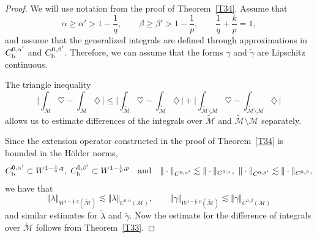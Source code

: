 \documentclass[intlimits,12pt,reqno]{amsart}
\newcommand{\cM}{\mathcal M}
\numberwithin{equation}{section}
\theoremstyle{definition}
\begin{document}
\begin{proof}
We will use notation from the proof of Theorem~\ref{T34}. Assume that
$$
\alpha\geq\alpha'>1-\frac{1}{q},
\qquad
\beta\geq\beta'>1-\frac{1}{p},
\qquad
\frac{1}{q}+\frac{k}{p}=1,
$$
and assume that the generalized integrals are defined through approximations in $C_{\rm b}^{0,\alpha'}$ and $C_{\rm b}^{0,\beta'}$. Therefore, we can assume that the forms $\gamma$ and $\tilde{\gamma}$ are Lipschitz continuous.

The triangle inequality
$$
\Bigg|\int_{\cM}\heartsuit-\int_{\cM}\diamondsuit\,\Bigg|\leq 
\Bigg|\int_{\widetilde{\cM}}\heartsuit-\int_{\widetilde{\cM}}\diamondsuit\,\Bigg|+
\Bigg|\int_{{\widetilde{\cM}}\setminus\cM}\heartsuit-\int_{{\widetilde{\cM}}\setminus\cM}\diamondsuit\,\Bigg|
$$
allows us to estimate differences of the integrals over $\widetilde{\cM}$ and $\widetilde{\cM}\setminus\cM$ separately.

Since the extension operator constructed in the proof of Theorem~\ref{T34} is bounded in the H\"older norms,
$$
C_{\rm b}^{0,\alpha'}\subset W^{1-\frac{1}{q},q},\ 
C_{\rm b}^{0,\beta'}\subset W^{1-\frac{1}{p},p}
\quad
\text{and}
\quad
\Vert\cdot\Vert_{C^{0,\alpha'}}\lesssim \Vert\cdot\Vert_{C^{0,\alpha}},\ 
\Vert\cdot\Vert_{C^{0,\beta'}}\lesssim \Vert\cdot\Vert_{C^{0,\beta}},
$$
we have that
$$
\Vert\lambda\Vert_{W^{1-\frac{1}{q},q}(\widetilde{\cM})}\lesssim 
\Vert\lambda\Vert_{C^{0,\alpha}(\cM)},
\qquad
\Vert\gamma\Vert_{W^{1-\frac{1}{p},p}(\widetilde{\cM})}\lesssim 
\Vert\gamma\Vert_{C^{0,\beta}(\cM)}
$$
and similar estimates for $\tilde{\lambda}$ and $\tilde{\gamma}$. Now the estimate for the difference of integrals over $\widetilde{\cM}$ follows from Theorem~\ref{T33}.


\end{proof}
\end{document}
